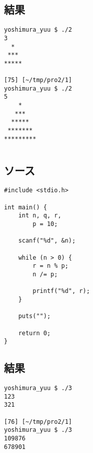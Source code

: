 \documentclass[11pt,a4paper,a4j]{jsarticle}
\begin{document}
\subsection{結果}
\begin{shadebox}
\begin{verbatim}
yoshimura_yuu $ ./2
3
  *  
 *** 
*****

[75] [~/tmp/pro2/1]
yoshimura_yuu $ ./2
5
    *    
   ***   
  *****  
 ******* 
*********
\end{verbatim}
\end{shadebox}
\clearpage

\section{}
\subsection{ソース}
\begin{shadebox}
\begin{verbatim}
#include <stdio.h>

int main() {
    int n, q, r,
        p = 10;

    scanf("%d", &n);

    while (n > 0) {
        r = n % p;
        n /= p;
        
        printf("%d", r);
    }

    puts("");

    return 0;
}
\end{verbatim}
\end{shadebox}

\subsection{結果}
\begin{shadebox}
\begin{verbatim}
yoshimura_yuu $ ./3
123
321

[76] [~/tmp/pro2/1]
yoshimura_yuu $ ./3
109876
678901
\end{verbatim}
\end{shadebox}
\clearpage
\end{document}
